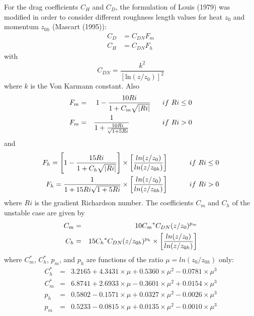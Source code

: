 For the drag coefficients $C_H$ and $C_D$, the formulation of
Louis (1979)\nocite{Louis1979} was modified in order to consider different
roughness length values for heat $z_0$ and momentum $z_{0h}$
(Mascart \etal (1995)\nocite{Mascart1995}):
%
\begin{align}
\label{eq:isba_drag_transfer_coef}
C_D &= C_{DN} F_m 
\\
\label{eq:isba_heat_transfer_coef}
C_H &= C_{DN} F_h
\end{align}
%
with
%
\begin{equation}
\label{eq:isba_drag_transfer_coef_neutral}
C_{DN} = \frac{k^2 }{ \left[ {\textrm{ln}} \left( z / z_0\right) \right]^2} 
\end{equation}
%
where $k$ is the Von Karmann constant.  Also
\begin{eqnarray}
F_m &=& 1 - {10 Ri \over 1 + C_m
        \sqrt{|Ri|} }  \ \ \ \ \ if \ Ri \leq 0 \\
F_m &=& {1 \over 1 + {10Ri \over \sqrt{1+5Ri}}} \
        \ \ \ \ \ \ \ \ \ \ \ \ \ if \ Ri > 0
\end{eqnarray}
and
\begin{eqnarray}
F_h = \left[ 1-{15Ri \over 1 + C_h \sqrt{|Ri|}} \right]
      \times \left[ {ln(z/z_{0}) \over ln(z/z_{0h})} \right] \
      \ \ \ \ \ \ \ \ if \ Ri \leq 0 \\
F_h = {1 \over 1+15Ri \sqrt{1+5Ri}}
      \times \left[ {ln(z/z_{0}) \over ln(z/z_{0h})} \right] \
      \ \ \ \ \ \ \ \ if \ Ri > 0
\end{eqnarray}
where $Ri$ is the gradient Richardson number.
The coefficients $C_m$ and $C_h$ of the unstable case are given by
\begin{eqnarray}
C_m &=& 10 {C_m}^* C_{DN} (z/z_{0})^{p_m} \\
C_h &=& 15 {C_h}^* C_{DN} (z/z_{0h})^{p_h} \times
        \left[ {ln(z/z_{0}) \over ln(z/z_{0h})} \right]
\end{eqnarray}
where $C^*_m$, $C^*_h$, $p_m$, and $p_h$ are functions of the ratio
$\mu = ln(z_{0}/z_{0h})$ only:
\begin{eqnarray}
C^*_h &=& 3.2165 + 4.3431 \times \mu + 0.5360 \times \mu^2
        - 0.0781 \times \mu^3 \\
C^*_m &=& 6.8741 + 2.6933 \times \mu - 0.3601 \times \mu^2
        + 0.0154 \times \mu^3 \\
p_h &=& 0.5802 - 0.1571 \times \mu + 0.0327 \times \mu^2
        - 0.0026 \times \mu^3 \\
p_m &=& 0.5233 - 0.0815 \times \mu + 0.0135 \times \mu^2
        - 0.0010 \times \mu^3
\end{eqnarray}


